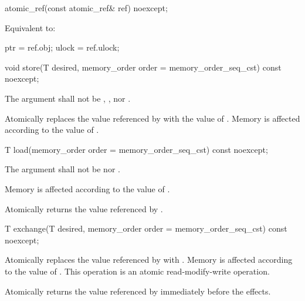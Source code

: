 \begin{itemdecl}
atomic_ref(const atomic_ref& ref) noexcept;
\end{itemdecl}

\begin{itemdescr}
\pnum
\effects {}
\begin{addedblock}Equivalent to:
\begin{codeblock}
  ptr = ref.obj;
  ulock = ref.ulock;
\end{codeblock}
\end{addedblock}

\end{itemdescr}


\begin{itemdecl}
void store(T desired, memory_order order = memory_order_seq_cst) const noexcept;
\end{itemdecl}

\begin{itemdescr}
\pnum
\removed{\requires}\added{\expects} The  argument shall not be
,
, nor
.

\pnum
\effects Atomically replaces the value referenced by 
with the value of .
Memory is affected according to the value of .
\end{itemdescr}


\begin{itemdecl}
T load(memory_order order = memory_order_seq_cst) const noexcept;
\end{itemdecl}

\begin{itemdescr}
\pnum
\removed{\requires}\added{\expects} The  argument shall not be
 nor .

\effects  Memory is affected according to the value of .

\pnum
\returns Atomically returns the value referenced by .
\end{itemdescr}


\begin{itemdecl}
T exchange(T desired, memory_order order = memory_order_seq_cst) const noexcept;
\end{itemdecl}

\begin{itemdescr}
\pnum
\effects Atomically replaces the value referenced by  with .
Memory is affected according to the value of .
This operation is an atomic read-modify-write operation.

\pnum
\returns Atomically returns the value referenced by 
immediately before the effects.
\end{itemdescr}


